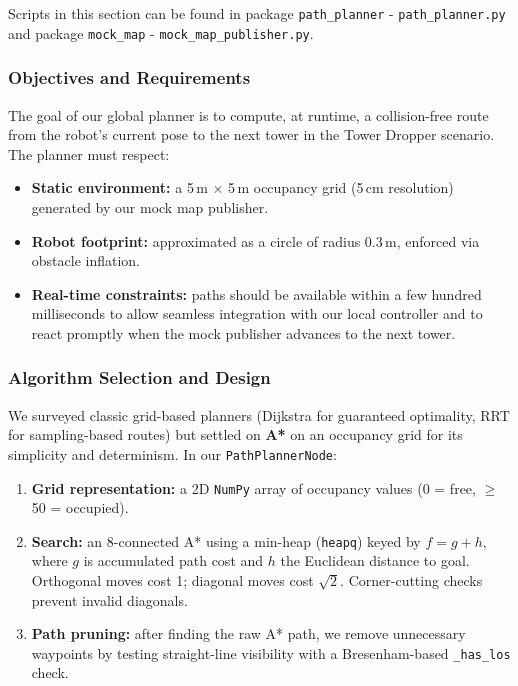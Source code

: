 Scripts in this section can be found in package \texttt{path\_planner} - \texttt{path\_planner.py} and package \texttt{mock\_map} - \texttt{mock\_map\_publisher.py}.

\subsubsection{Objectives and Requirements}
The goal of our global planner is to compute, at runtime, a collision-free route from the robot’s current pose to the next tower in the Tower Dropper scenario. The planner must respect:
\begin{itemize}
  \item \textbf{Static environment:} a 5\,m × 5\,m occupancy grid (5\,cm resolution) generated by our mock map publisher.
  \item \textbf{Robot footprint:} approximated as a circle of radius 0.3\,m, enforced via obstacle inflation.
  \item \textbf{Real-time constraints:} paths should be available within a few hundred milliseconds to allow seamless integration with our local controller and to react promptly when the mock publisher advances to the next tower.
\end{itemize}

\subsubsection{Algorithm Selection and Design}
We surveyed classic grid-based planners (Dijkstra for guaranteed optimality, RRT for sampling-based routes) but settled on \textbf{A*} on an occupancy grid for its simplicity and determinism. In our \texttt{PathPlannerNode}:
\begin{enumerate}
  \item \textbf{Grid representation:} a 2D \texttt{NumPy} array of occupancy values (0 = free, $\geq$50 = occupied).
  \item \textbf{Search:} an 8-connected A* using a min-heap (\texttt{heapq}) keyed by $f = g + h$, where $g$ is accumulated path cost and $h$ the Euclidean distance to goal. Orthogonal moves cost 1; diagonal moves cost $\sqrt{2}$. Corner-cutting checks prevent invalid diagonals.
  \item \textbf{Path pruning:} after finding the raw A* path, we remove unnecessary waypoints by testing straight-line visibility with a Bresenham-based \texttt{\_has\_los} check.
\end{enumerate}

